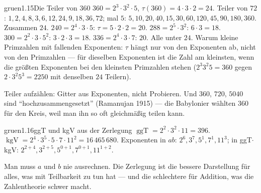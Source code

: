 \begin{loesungkarte}{gruen}{1.15}{Die Teiler von 360}
$360 = 2^{3}\cdot3^{2}\cdot5$, $\tau(360) = 4\cdot3\cdot2 = 24$. Teiler von $72$: $1, 2, 4, 8, 3, 6, 12, 24, 9, 18, 36, 72$; mal $5$: $5, 10, 20, 40, 15, 30, 60, 120, 45, 90, 180, 360$. Zusammen $24$. \checkmark
{}
$240 = 2^{4}\cdot3\cdot5$: $\tau = 5\cdot2\cdot2 = 20$. $288 = 2^{5}\cdot3^{2}$: $6\cdot3 = 18$. $300 = 2^{2}\cdot3\cdot5^{2}$: $3\cdot2\cdot3 = 18$. $336 = 2^{4}\cdot3\cdot7$: $20$. Alle unter $24$. Warum kleine Primzahlen mit fallenden Exponenten: $\tau$ hängt nur von den Exponenten ab, nicht von den Primzahlen --- für dieselben Exponenten ist die Zahl am kleinsten, wenn die größten Exponenten bei den kleinsten Primzahlen stehen ($2^{3}3^{2}5 = 360$ gegen $2\cdot3^{2}5^{3} = 2250$ mit denselben $24$ Teilern).
\begin{mitnehmen}\kastentext
Teiler aufzählen: Gitter aus Exponenten, nicht Probieren. Und $360$, $720$, $5040$ sind \enquote{hochzusammengesetzt} (Ramanujan 1915) --- die Babylonier wählten $360$ für den Kreis, weil man ihn so oft gleichmäßig teilen kann.
\end{mitnehmen}
\end{loesungkarte}

\begin{loesungkarte}{gruen}{1.16}{ggT und kgV aus der Zerlegung}
$\operatorname{ggT} = 2^{2}\cdot3^{2}\cdot11 = 396$. $\operatorname{kgV} = 2^{4}\cdot3^{5}\cdot5\cdot7\cdot11^{2} = 16\,465\,680$.
Exponenten in $ab$: $2^{6}, 3^{7}, 5^{1}, 7^{1}, 11^{3}$; in ggT$\cdot$kgV: $2^{2+4}, 3^{2+5}, 5^{0+1}, 7^{0+1}, 11^{1+2}$. \checkmark
\begin{mitnehmen}\kastentext
Man muss $a$ und $b$ nie ausrechnen. Die Zerlegung ist die bessere Darstellung für alles, was mit Teilbarkeit zu tun hat --- und die schlechtere für Addition, was die Zahlentheorie schwer macht.
\end{mitnehmen}
\end{loesungkarte}

